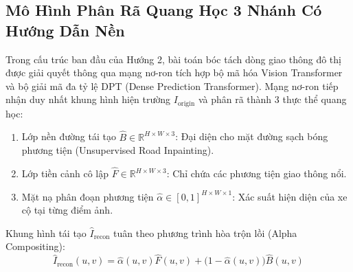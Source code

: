 \documentclass[11pt,a4paper]{article}
\begin{document}
\subsection{Mô Hình Phân Rã Quang Học 3 Nhánh Có Hướng Dẫn Nền}
Trong cấu trúc ban đầu của Hướng 2, bài toán bóc tách dòng giao thông đô thị được giải quyết thông qua mạng nơ-ron tích hợp bộ mã hóa Vision Transformer và bộ giải mã đa tỷ lệ DPT (Dense Prediction Transformer). Mạng nơ-ron tiếp nhận duy nhất khung hình hiện trường $I_{\text{origin}}$ và phân rã thành 3 thực thể quang học:
\begin{enumerate}
    \item Lớp nền đường tái tạo $\hat{B} \in \mathbb{R}^{H \times W \times 3}$: Đại diện cho mặt đường sạch bóng phương tiện (Unsupervised Road Inpainting).
    \item Lớp tiền cảnh cô lập $\hat{F} \in \mathbb{R}^{H \times W \times 3}$: Chỉ chứa các phương tiện giao thông nổi.
    \item Mặt nạ phân đoạn phương tiện $\hat{\alpha} \in [0, 1]^{H \times W \times 1}$: Xác suất hiện diện của xe cộ tại từng điểm ảnh.
\end{enumerate}
Khung hình tái tạo $\hat{I}_{\text{recon}}$ tuân theo phương trình hòa trộn lồi (Alpha Compositing):
\begin{equation}
    \hat{I}_{\text{recon}}(u, v) = \hat{\alpha}(u, v) \hat{F}(u, v) + \big(1 - \hat{\alpha}(u, v)\big) \hat{B}(u, v)
\end{equation}
\end{document}
